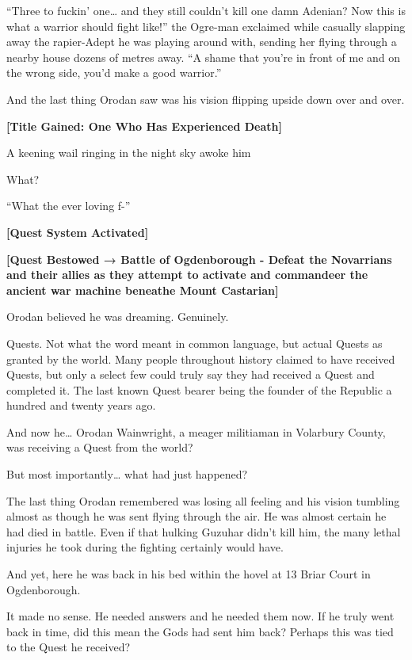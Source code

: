 \documentclass[a4paper,10pt]{book}
\begin{document}
“Three to fuckin’ one… and they still couldn’t kill one damn Adenian? Now this is what a warrior should fight like!” the Ogre-man exclaimed while casually slapping away the rapier-Adept he was playing around with, sending her flying through a nearby house dozens of metres away. “A shame that you’re in front of me and on the wrong side, you’d make a good warrior.”\par
And the last thing Orodan saw was his vision flipping upside down over and over.\par
\textbf{[Title Gained: One Who Has Experienced Death]}\par
\par
A keening wail ringing in the night sky awoke him\par
What?\par
“What the ever loving f-”\par
\textbf{[Quest System Activated]}\par
\textbf{[Quest Bestowed → Battle of Ogdenborough - Defeat the Novarrians and their allies as they attempt to activate and commandeer the ancient war machine beneathe Mount Castarian]}\par
Orodan believed he was dreaming. Genuinely.\par
Quests. Not what the word meant in common language, but actual Quests as granted by the world. Many people throughout history claimed to have received Quests, but only a select few could truly say they had received a Quest and completed it. The last known Quest bearer being the founder of the Republic a hundred and twenty years ago.\par
And now he… Orodan Wainwright, a meager militiaman in Volarbury County, was receiving a Quest from the world?\par
But most importantly… what had just happened?\par
The last thing Orodan remembered was losing all feeling and his vision tumbling almost as though he was sent flying through the air. He was almost certain he had died in battle. Even if that hulking Guzuhar didn’t kill him, the many lethal injuries he took during the fighting certainly would have.\par
And yet, here he was back in his bed within the hovel at 13 Briar Court in Ogdenborough.\par
It made no sense. He needed answers and he needed them now. If he truly went back in time, did this mean the Gods had sent him back? Perhaps this was tied to the Quest he received?\par
\end{document}
